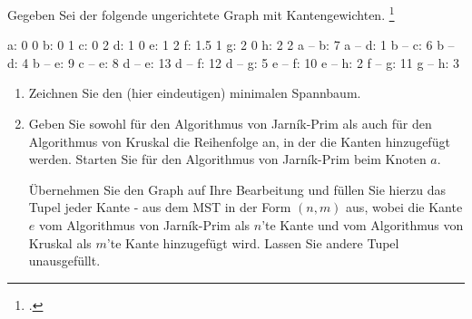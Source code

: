 \documentclass{bschlangaul-aufgabe}
\begin{document}

Gegeben Sei der folgende ungerichtete Graph mit Kantengewichten.
\footcite{examen:66115:2019:09}

\begin{bGraphenFormat}
a: 0 0
b: 0 1
c: 0 2
d: 1 0
e: 1 2
f: 1.5 1
g: 2 0
h: 2 2
a -- b: 7
a -- d: 1
b -- c: 6
b -- d: 4
b -- e: 9
c -- e: 8
d -- e: 13
d -- f: 12
d -- g: 5
e -- f: 10
e -- h: 2
f -- g: 11
g -- h: 3
\end{bGraphenFormat}

\begin{center}
\end{center}

\begin{enumerate}


\item Zeichnen Sie den (hier eindeutigen) minimalen Spannbaum.


\item Geben Sie sowohl für den Algorithmus von Jarník-Prim als auch für
den Algorithmus von Kruskal die Reihenfolge an, in der die Kanten
hinzugefügt werden. Starten Sie für den Algorithmus von Jarník-Prim beim
Knoten $a$.

Übernehmen Sie den Graph auf Ihre Bearbeitung und füllen Sie hierzu das
Tupel jeder Kante - aus dem MST in der Form $(n, m)$ aus, wobei die
Kante $e$ vom Algorithmus von Jarník-Prim als $n$’te Kante und vom
Algorithmus von Kruskal als $m$’te Kante hinzugefügt wird. Lassen Sie
andere Tupel unausgefüllt.
\end{enumerate}
\end{document}
